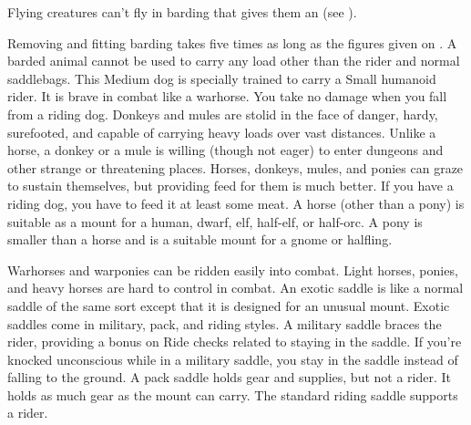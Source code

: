         \par Flying creatures can't fly in barding that gives them an  (see ).
        \par Removing and fitting barding takes five times as long as the figures given on . A barded animal cannot be used to carry any load other than the rider and normal saddlebags.
         This Medium dog is specially trained to carry a Small humanoid rider. It is brave in combat like a warhorse. You take no damage when you fall from a riding dog.
         Donkeys and mules are stolid in the face of danger, hardy, surefooted, and capable of carrying heavy loads over vast distances. Unlike a horse, a donkey or a mule is willing (though not eager) to enter dungeons and other strange or threatening places.
         Horses, donkeys, mules, and ponies can graze to sustain themselves, but providing feed for them is much better. If you have a riding dog, you have to feed it at least some meat.
         A horse (other than a pony) is suitable as a mount for a human, dwarf, elf, half-elf, or half-orc. A pony is smaller than a horse and is a suitable mount for a gnome or halfling.
        \par Warhorses and warponies can be ridden easily into combat. Light horses, ponies, and heavy horses are hard to control in combat.
         An exotic saddle is like a normal saddle of the same sort except that it is designed for an unusual mount. Exotic saddles come in military, pack, and riding styles.
         A military saddle braces the rider, providing a  bonus on Ride checks related to staying in the saddle. If you're knocked unconscious while in a military saddle, you stay in the saddle instead of falling to the ground.
         A pack saddle holds gear and supplies, but not a rider. It holds as much gear as the mount can carry.
         The standard riding saddle supports a rider.

